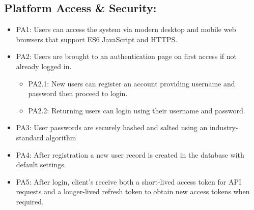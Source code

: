 \subsection{Platform Access \& Security:}
\begin{itemize}
    \item\label{req:PA1} PA1: Users can access the system via modern desktop and mobile web browsers that support ES6 JavaScript and HTTPS.
    \item\label{req:PA2} PA2: Users are brought to an authentication page on first access if not already logged in.
    \begin{itemize}
        \item\label{req:PA2.1} PA2.1: New users can register an account providing username and password then proceed to login.
        \item\label{req:PA2.2} PA2.2: Returning users can login using their username and password.
    \end{itemize}
    \item\label{req:PA3} PA3: User passwords are securely hashed and salted using an industry-standard algorithm
    \item\label{req:PA4} PA4: After registration a new user record is created in the database with default settings.
    \item\label{req:PA5} PA5: After login, client's receive both a short-lived access token for API requests and a longer-lived refresh token to obtain new access tokens when required.
\end{itemize}

